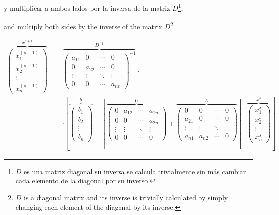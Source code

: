 \begin{paracol}{2}
 y multiplicar a ambos lados por la inversa de la matriz $D$\footnote{$D$ es una matriz diagonal su inversa se calcula trivialmente sin más cambiar cada elemento de la diagonal por su inverso.},
 
\switchcolumn
 and multiply both sides by the inverse of the matrix $D$\footnote{$D$ is a diagonal matrix and its inverse is trivially calculated by simply changing each element of the diagonal by its inverse,}
\end{paracol}
\newpage
 \begin{align*}
 \overbrace{\begin{pmatrix}
x_1^{(s+1)}\\
x_2^{(s+1)}\\
\vdots \\
x_n^{(s+1)}
\end{pmatrix}}^{x^{s+1}}= &
\overbrace{\begin{pmatrix}
a_{11}& 0& \cdots & 0\\
0& a_{22}& \cdots & 0\\
\vdots & \vdots & \ddots & \vdots\\
0& 0& \cdots & a_{nn}
\end{pmatrix}^{-1}}^{D^{-1}} \cdot\\
&\cdot \left[ \overbrace{\begin{pmatrix}
b_1\\
b_2\\
\vdots \\
b_n
\end{pmatrix}}^b- \left[\overbrace{\begin{pmatrix}
0& a_{12}& \cdots & a_{1n}\\
0& 0& \cdots & a_{2n}\\
\vdots & \vdots & \ddots & \vdots\\
0& 0& \cdots & 0
\end{pmatrix}}^U+
\overbrace{\begin{pmatrix}
0& 0& \cdots & 0\\
a_{21}& 0& \cdots & 0\\
\vdots & \vdots & \ddots & \vdots\\
a_{n1}& a_{n2}& \cdots & 0
\end{pmatrix}}^L \right] \cdot \overbrace{\begin{pmatrix}
x_1^s\\
x_2^s\\
\vdots \\
x_n^s
\end{pmatrix}}^{x^s}\right]  
\end{align*}

